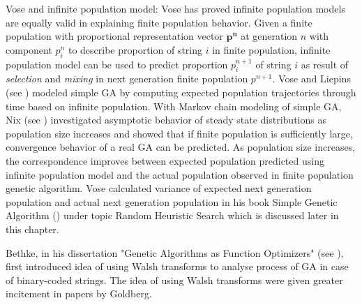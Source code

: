 Vose and infinite population model:
Vose has proved infinite population models are equally valid in explaining finite population behavior. Given a finite population with proportional representation vector $\bm{p^n}$ at generation $n$ with component $p_i^n$ to describe proportion of string $i$ in finite population, infinite population model can be used to predict proportion $p_i^{n+1}$ of string $i$ as result of \textit{selection} and \textit{mixing} in next generation finite population $p^{n+1}$. Vose and Liepins (see \cite{VoseLiepins1991}) modeled simple GA by computing expected population trajectories through time based on infinite population. With Markov chain modeling of simple GA, Nix (see \cite{Nix1992}) investigated asymptotic behavior of steady state distributions as population size increases and showed that if finite population is sufficiently large, convergence behavior of a real GA can be predicted. As population size increases, the correspondence improves between expected population predicted using infinite population model and the actual population observed in finite population genetic algorithm.  Vose calculated variance of expected next generation population and actual next generation population in his book Simple Genetic Algorithm (\cite{Vose1999}) under topic Random Heuristic Search which is discussed later in this chapter. 

Bethke, in his dissertation "Genetic Algorithms as Function Optimizers" (see \cite{Bethke1981}), first introduced idea of using Walsh transforms to analyse process of GA in case of binary-coded strings. The idea of using Walsh transforms were given greater incitement in papers by Goldberg.